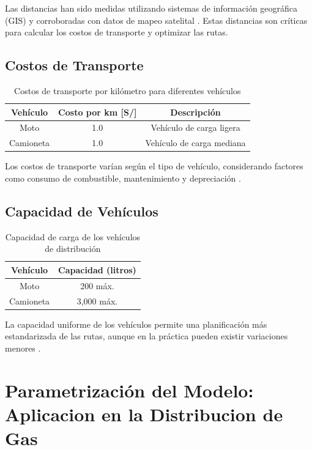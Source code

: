 \documentclass[11pt, a4paper]{article}
\begin{document}
Las distancias han sido medidas utilizando sistemas de información geográfica (GIS) y corroboradas con datos de mapeo satelital \citep{Ballou2004}. Estas distancias son críticas para calcular los costos de transporte y optimizar las rutas.

\subsection{Costos de Transporte}
\begin{table}[H]
\centering
\begin{tabular}{|c|c|c|}
\hline

\textbf{Vehículo}& \textbf{Costo por km [S/]} & \textbf{Descripción} \\
\hline
Moto & 1.0 & Vehículo de carga ligera \\
\hline
Camioneta & 1.0& Vehículo de carga mediana \\
\hline
\end{tabular}
\caption{Costos de transporte por kilómetro para diferentes vehículos}
\label{tab:costos_transporte}
\end{table}

Los costos de transporte varían según el tipo de vehículo, considerando factores como consumo de combustible, mantenimiento y depreciación \citep{Chopra2018}.

\subsection{Capacidad de Vehículos}
\begin{table}[H]
\centering
\begin{tabular}{|c|c|}
\hline
\textbf{Vehículo} & \textbf{Capacidad (litros)} \\
\hline
Moto & 200 máx. \\
\hline
Camioneta & 3,000 máx. \\
\hline
\end{tabular}
\caption{Capacidad de carga de los vehículos de distribución}
\label{tab:capacidad_vehiculos}
\end{table}

La capacidad uniforme de los vehículos permite una planificación más estandarizada de las rutas, aunque en la práctica pueden existir variaciones menores \citep{Nahmias2014}.



\section{Parametrización del Modelo: 
 Aplicacion en la Distribucion de Gas }
\end{document}
